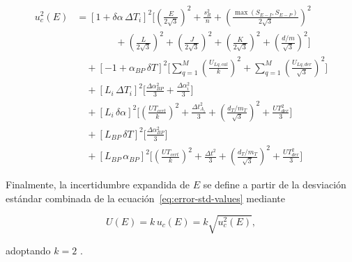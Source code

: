 \begin{align}
    u_c^2(E) &=
    [1 + \delta\alpha \, \Delta T_i]^2
    \Bigg[
        \left(\frac{E}{2\sqrt{3}}\right)^2
        + \frac{s_R^2}{n}
        + \left(\frac{\max(S_{E-I}, S_{E-P})}{2\sqrt{3}}\right)^2 \nonumber \\
    &\qquad\qquad
        + \left(\frac{L}{2\sqrt{3}}\right)^2
        + \left(\frac{J}{2\sqrt{3}}\right)^2
        + \left(\frac{K}{2\sqrt{3}}\right)^2
        + \left(\frac{d/m}{\sqrt{3}}\right)^2
    \Bigg] \nonumber \\[4pt]
    &\quad + [-1 + \alpha_{BP} \, \delta T]^2
    \Bigg[
        \sum_{q=1}^M \left(\frac{U_{Lq,cal}}{k}\right)^2
        + \sum_{q=1}^M \left(\frac{U_{Lq,der}}{\sqrt{3}}\right)^2
    \Bigg] \nonumber \\[4pt]
    &\quad + [L_i \, \Delta T_i]^2
    \Bigg[
        \frac{\Delta\alpha_{BP}^2}{3} + \frac{\Delta\alpha_i^2}{3}
    \Bigg] \nonumber \\[4pt]
    &\quad + [L_i \, \delta\alpha]^2
    \Bigg[
        \left(\frac{UT_{cert}}{k}\right)^2
        + \frac{\Delta t_{A_i}^2}{3}
        + \left(\frac{d_T / m_T}{\sqrt{3}}\right)^2
        + \frac{UT_{der}^2}{3}
    \Bigg] \nonumber \\[4pt]
    &\quad + [L_{BP} \, \delta T]^2
    \Bigg[
        \frac{\Delta\alpha_{BP}^2}{3}
    \Bigg] \nonumber \\[4pt]
    &\quad + [L_{BP} \, \alpha_{BP}]^2
    \Bigg[
        \left(\frac{UT_{cert}}{k}\right)^2
        + \frac{\Delta t^2}{3}
        + \left(\frac{d_T / m_T}{\sqrt{3}}\right)^2
        + \frac{UT_{der}^2}{3}
    \Bigg] \label{eq:sigma-cuad-expandida}
\end{align}

Finalmente, la incertidumbre expandida de $E$ se define a partir de la desviación
estándar combinada de la ecuación~\eqref{eq:error-std-values} mediante

\begin{equation}
    U(E) = k\,u_c(E) = k\sqrt{u_c^2(E)},
    \label{eq:incertidumbre-expandida}
\end{equation}

adoptando $k = 2$ \parencite{jcgm2008gum}.
